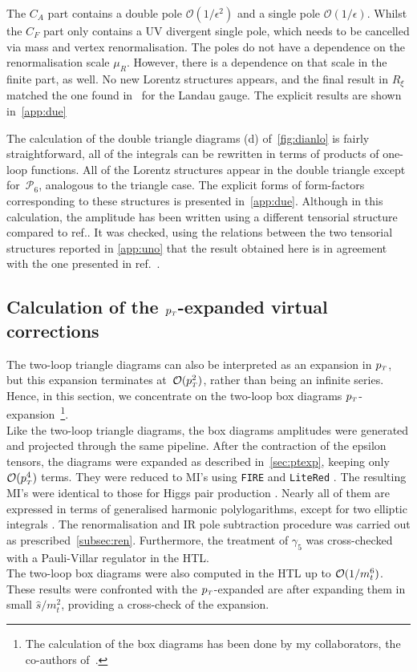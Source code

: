 The $C_A$ part contains a double pole $ \mathcal O( 1/\epsilon^2)$ and a single pole $ \mathcal O( 1/\epsilon)$. Whilst the $C_F$ part only contains a UV divergent single pole, which needs to be cancelled via mass and vertex renormalisation. The poles do not have a dependence on the renormalisation scale $ \mu_R$. However, there is a dependence on that scale in the finite part, as well.  No new Lorentz structures appears, and the final result in $R_\xi$ matched the one found in~\cite{Spira:1995rr,Aglietti:2006tp} for the Landau gauge. The explicit results are shown in~\autoref{app:due}
%
\par  The calculation of the double triangle diagrams (d) of~\autoref{fig:dianlo} is fairly straightforward, all of the 
integrals can be rewritten in terms of products of one-loop functions. All of the Lorentz structures appear in the double triangle except for~$\mathcal{P}_6$, analogous to the triangle case. The explicit forms of form-factors corresponding to these structures is presented in~\autoref{app:due}. Although in this calculation, the amplitude has been written using a different
tensorial structure compared to ref.\cite{Davies:2020drs}. It was  checked,
using the relations between the two tensorial structures reported in 
\autoref{app:uno} that the result obtained here is in agreement with the one presented
in ref.~\cite{Hasselhuhn:2016rqt}.
\subsection{Calculation of the $p_{\scriptscriptstyle T}$-expanded virtual corrections}
\par The two-loop triangle diagrams can also be interpreted as an expansion in $p_{\scriptscriptstyle T}$, but this expansion terminates at~${\cal O}(p_{\scriptscriptstyle T}^2)$, rather than being an infinite series. Hence, in this section, we concentrate on the two-loop box diagrams $p_{\scriptscriptstyle T}$-expansion~\footnote{The calculation of the box diagrams has been done by my collaborators, the co-authors of~\cite{Alasfar:2021ppe}.}.\\
Like the two-loop triangle diagrams, the box diagrams amplitudes were generated and projected through the same pipeline. After the contraction of the epsilon tensors, the diagrams were expanded as
described in~\autoref{sec:ptexp}, keeping only ${\cal O}(p_{\scriptscriptstyle T}^4)$ terms. They were reduced to MI's
using \texttt{FIRE} \cite{Smirnov:2014hma} and \texttt{LiteRed} \cite{Lee:2013mka}. The
resulting MI's were identical to those for Higgs pair
production \cite{Bonciani:2018omm}. Nearly all of them are expressed
in terms of generalised harmonic polylogarithms, except for
two elliptic integrals \cite{vonManteuffel:2017hms, Bonciani:2018uvv}. The renormalisation and IR pole subtraction procedure was carried out as prescribed~\autoref{subsec:ren}. Furthermore, the treatment of $\gamma_5$ was cross-checked with a Pauli-Villar regulator in the HTL.\\
The two-loop box diagrams were also computed in the HTL up to  $\mathcal{O}(1/m_t^6)$. These results were confronted with the $p_{\scriptscriptstyle T}$-expanded are after expanding them in small $\hat s/m_t^2$, providing a cross-check of the expansion. 

